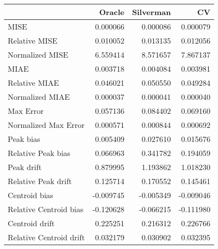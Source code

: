 \begin{tabular}{lrrr}
  \hline
 & Oracle & Silverman & CV \\ 
  \hline
MISE & 0.000066 & 0.000086 & 0.000079 \\ 
  Relative MISE & 0.010052 & 0.013135 & 0.012056 \\ 
  Normalized MISE & 6.559414 & 8.571657 & 7.867137 \\ 
  MIAE & 0.003718 & 0.004084 & 0.003981 \\ 
  Relative MIAE & 0.046021 & 0.050550 & 0.049284 \\ 
  Normalized MIAE & 0.000037 & 0.000041 & 0.000040 \\ 
  Max Error & 0.057136 & 0.084402 & 0.069160 \\ 
  Normalized Max Error & 0.000571 & 0.000844 & 0.000692 \\ 
  Peak bias & 0.005409 & 0.027610 & 0.015676 \\ 
  Relative Peak bias & 0.066963 & 0.341782 & 0.194059 \\ 
  Peak drift & 0.879995 & 1.193862 & 1.018230 \\ 
  Relative Peak drift & 0.125714 & 0.170552 & 0.145461 \\ 
  Centroid bias & -0.009745 & -0.005349 & -0.009046 \\ 
  Relative Centroid bias & -0.120628 & -0.066215 & -0.111980 \\ 
  Centroid drift & 0.225251 & 0.216312 & 0.226766 \\ 
  Relative Centroid drift & 0.032179 & 0.030902 & 0.032395 \\ 
   \hline
\end{tabular}

